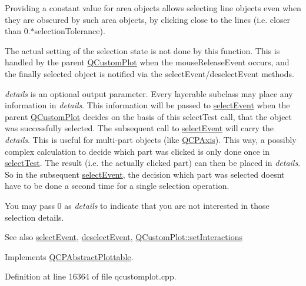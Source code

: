 Providing a constant value for area objects allows selecting line objects even when they are obscured by such area objects, by clicking close to the lines (i.\+e. closer than 0.$\ast$selection\+Tolerance).

The actual setting of the selection state is not done by this function. This is handled by the parent \hyperlink{class_q_custom_plot}{Q\+Custom\+Plot} when the mouse\+Release\+Event occurs, and the finally selected object is notified via the select\+Event/deselect\+Event methods.

{\itshape details} is an optional output parameter. Every layerable subclass may place any information in {\itshape details}. This information will be passed to \hyperlink{class_q_c_p_abstract_plottable_a16aaad02456aa23a759efd1ac90c79bf}{select\+Event} when the parent \hyperlink{class_q_custom_plot}{Q\+Custom\+Plot} decides on the basis of this select\+Test call, that the object was successfully selected. The subsequent call to \hyperlink{class_q_c_p_abstract_plottable_a16aaad02456aa23a759efd1ac90c79bf}{select\+Event} will carry the {\itshape details}. This is useful for multi-\/part objects (like \hyperlink{class_q_c_p_axis}{Q\+C\+P\+Axis}). This way, a possibly complex calculation to decide which part was clicked is only done once in \hyperlink{class_q_c_p_graph_abc9ff375aabcf2d21cca33d6baf85772}{select\+Test}. The result (i.\+e. the actually clicked part) can then be placed in {\itshape details}. So in the subsequent \hyperlink{class_q_c_p_abstract_plottable_a16aaad02456aa23a759efd1ac90c79bf}{select\+Event}, the decision which part was selected doesn\textquotesingle{}t have to be done a second time for a single selection operation.

You may pass 0 as {\itshape details} to indicate that you are not interested in those selection details.

\begin{DoxySeeAlso}{See also}
\hyperlink{class_q_c_p_abstract_plottable_a16aaad02456aa23a759efd1ac90c79bf}{select\+Event}, \hyperlink{class_q_c_p_abstract_plottable_a6fa0d0f95560ea8b01ee13f296dab2b1}{deselect\+Event}, \hyperlink{class_q_custom_plot_a5ee1e2f6ae27419deca53e75907c27e5}{Q\+Custom\+Plot\+::set\+Interactions} 
\end{DoxySeeAlso}


Implements \hyperlink{class_q_c_p_abstract_plottable_a38efe9641d972992a3d44204bc80ec1d}{Q\+C\+P\+Abstract\+Plottable}.



Definition at line 16364 of file qcustomplot.\+cpp.




